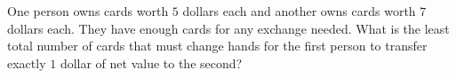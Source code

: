 One person owns cards worth $5$ dollars each and another owns cards worth $7$ dollars each. They have enough cards for any exchange needed. What is the least total number of cards that must change hands for the first person to transfer exactly $1$ dollar of net value to the second?
